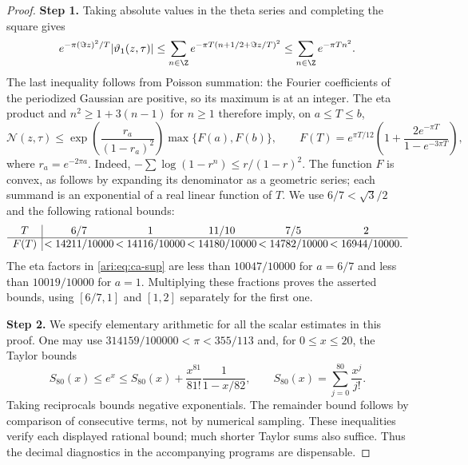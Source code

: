 \begin{proof}
\noindent\textbf{Step 1.} Taking absolute values in the theta series and completing the square
gives
\[
 e^{-\pi(\Im z)^2/T}|\vartheta_1(z,\tau)|
 \le\sum_{n\in\Z}
 e^{-\pi T(n+1/2+\Im z/T)^2}
 \le\sum_{n\in\Z}e^{-\pi Tn^2}.
\]
The last inequality follows from Poisson summation: the Fourier
coefficients of the periodized Gaussian are positive, so its maximum
is at an integer. The eta product and $n^2\ge1+3(n-1)$ for $n\ge1$
therefore imply, on $a\le T\le b$,
\begin{equation}\label{ari:eq:ca-sup}
 \mathcal N(z,\tau)\le
 \exp\!\left(\frac{r_a}{(1-r_a)^2}\right)
 \max\{F(a),F(b)\},\qquad
 F(T)=e^{\pi T/12}
 \left(1+\frac{2e^{-\pi T}}{1-e^{-3\pi T}}\right),
\end{equation}
where $r_a=e^{-2\pi a}$. Indeed,
$-\sum\log(1-r^n)\le r/(1-r)^2$. The function $F$ is convex,
as follows by expanding its denominator as a geometric series;
each summand is an exponential of a real linear function of $T$.
We use $6/7<\sqrt3/2$ and the following rational bounds:
\[
\begin{array}{c|@{\,}c@{\,}c@{\,}c@{\,}c@{\,}c}
T&6/7&1&11/10&7/5&2\\ \hline
F(T)&<14211/10000&<14116/10000&<14180/10000&<14782/10000&<16944/10000.
\end{array}
\]
The eta factors in \eqref{ari:eq:ca-sup} are less than $10047/10000$
for $a=6/7$ and less than $10019/10000$ for $a=1$.
Multiplying these fractions proves the asserted bounds, using
$[6/7,1]$ and $[1,2]$ separately for the first one.


\noindent\textbf{Step 2.} We specify elementary arithmetic for all the scalar estimates in
this proof. One may use $314159/100000<\pi<355/113$ and, for
$0\le x\le20$, the Taylor bounds
\begin{equation}\label{ari:eq:ca-exp}
 S_{80}(x)\le e^x\le
 S_{80}(x)+\frac{x^{81}}{81!}\frac1{1-x/82},
 \qquad S_{80}(x)=\sum_{j=0}^{80}\frac{x^j}{j!}.
\end{equation}
Taking reciprocals bounds negative exponentials. The remainder
bound follows by comparison of consecutive terms, not by numerical
sampling. These inequalities verify each displayed rational bound;
much shorter Taylor sums also suffice. Thus the decimal diagnostics
in the accompanying programs are dispensable.



\end{proof}

